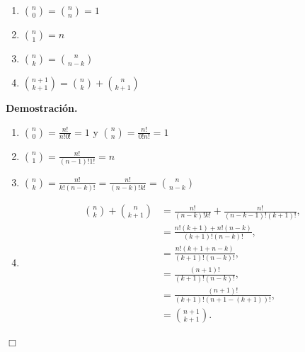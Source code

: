 \begin{prop}
\begin{enumerate}
\item $\binom{n}{0} = \binom{n}{n} = 1$ 
\item $\binom{n}{1} = n$ 
\item $\binom{n}{k} = \binom{n}{n-k}$
\item $\binom{n+1}{k+1} = \binom{n}{k} + \binom{n}{k+1}$
\end{enumerate}
\end{prop}
{\bf Demostración.}
\begin{enumerate}
\item ${n\choose 0}=\frac{n!}{n!0!}=1$ y ${n\choose n}=\frac{n!}{0!n!}=1$
\item ${n\choose 1}=\frac{n!}{(n-1)!1!}=n$
\item ${n\choose k}=\frac{n!}{k!(n-k)!}=\frac{n!}{(n-k)!k!}={n\choose n-k}$
\item
  \begin{align*}
    \binom{n}{k} + \binom{n}{k+1} &= \frac{n!}{(n-k)!k!} + \frac{n!}{(n-k-1)!(k+1)!},\\
    &= \frac{n!(k+1) + n!(n-k)}{(k+1)!(n-k)!},\\
    &= \frac{n!(k+1+n-k)}{(k+1)!(n-k)!},\\
    &= \frac{(n+1)!}{(k+1)!(n-k)!},\\
    &= \frac{(n+1)!}{(k+1)!(n+1-(k+1))!},\\
    &= \binom{n+1}{k+1}.
  \end{align*}
\end{enumerate}
\hfill $\Box$

